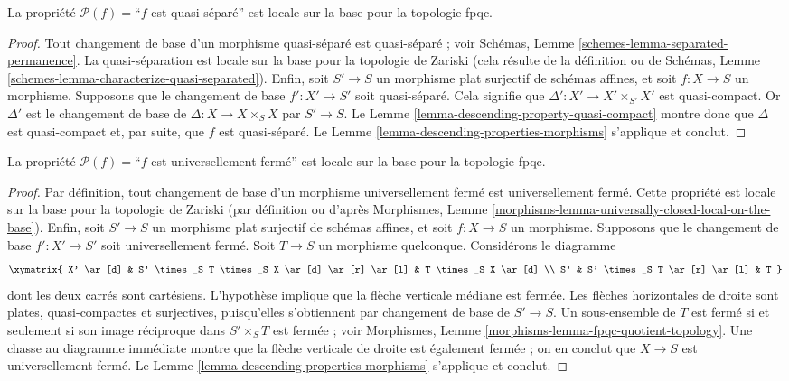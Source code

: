 \begin{lemma}
\label{lemma-descending-property-quasi-separated}
La propriété $\mathcal{P}(f) =$``$f$ est quasi-séparé'' est locale sur la
base pour la topologie fpqc.
\end{lemma}

\begin{proof}
Tout changement de base d'un morphisme quasi-séparé est quasi-séparé ; voir
Schémas, Lemme \ref{schemes-lemma-separated-permanence}. La quasi-séparation
est locale sur la base pour la topologie de Zariski (cela résulte de la
définition ou de Schémas, Lemme
\ref{schemes-lemma-characterize-quasi-separated}). Enfin, soit $S' \to S$
un morphisme plat surjectif de schémas affines, et soit $f : X \to S$ un
morphisme. Supposons que le changement de base $f' : X' \to S'$ soit
quasi-séparé. Cela signifie que
$\Delta' : X' \to X'\times_{S'} X'$ est quasi-compact. Or $\Delta'$ est le
changement de base de $\Delta : X \to X \times_S X$ par $S' \to S$.
Le Lemme \ref{lemma-descending-property-quasi-compact} montre donc que
$\Delta$ est quasi-compact et, par suite, que $f$ est quasi-séparé.
Le Lemme \ref{lemma-descending-properties-morphisms} s'applique et conclut.
\end{proof}

\begin{lemma}
\label{lemma-descending-property-universally-closed}
La propriété $\mathcal{P}(f) =$``$f$ est universellement fermé'' est locale
sur la base pour la topologie fpqc.
\end{lemma}

\begin{proof}
Par définition, tout changement de base d'un morphisme universellement fermé
est universellement fermé. Cette propriété est locale sur la base pour la
topologie de Zariski (par définition ou d'après Morphismes, Lemme
\ref{morphisms-lemma-universally-closed-local-on-the-base}). Enfin, soit
$S' \to S$ un morphisme plat surjectif de schémas affines, et soit
$f : X \to S$ un morphisme. Supposons que le changement de base
$f' : X' \to S'$ soit universellement fermé. Soit $T \to S$ un morphisme
quelconque. Considérons le diagramme
$$
\xymatrix{
X' \ar[d] &
S' \times_S T \times_S X \ar[d] \ar[r] \ar[l] &
T \times_S X \ar[d] \\
S' &
S' \times_S T \ar[r] \ar[l] &
T
}
$$
dont les deux carrés sont cartésiens. L'hypothèse implique que la flèche
verticale médiane est fermée. Les flèches horizontales de droite sont plates,
quasi-compactes et surjectives, puisqu'elles s'obtiennent par changement de
base de $S' \to S$. Un sous-ensemble de $T$ est fermé si et seulement si son
image réciproque dans $S' \times_S T$ est fermée ; voir Morphismes, Lemme
\ref{morphisms-lemma-fpqc-quotient-topology}. Une chasse au diagramme
immédiate montre que la flèche verticale de droite est également fermée ; on
en conclut que $X \to S$ est universellement fermé. Le Lemme
\ref{lemma-descending-properties-morphisms} s'applique et conclut.
\end{proof}

